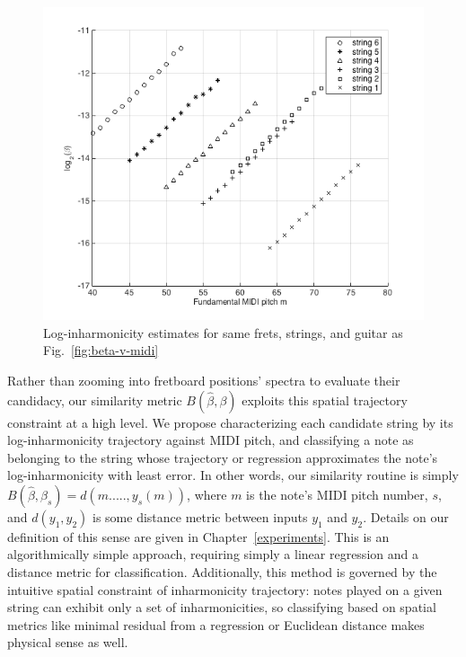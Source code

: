 \documentclass[12pt]{cmuthesis}
\begin{document}
\begin{figure}[h] 
\label{fig:log-beta-v-midi}
\centering
\includegraphics[scale=0.7]{log-beta-v-midi}
\caption{Log-inharmonicity estimates for same frets, strings, and guitar as Fig.~\ref{fig:beta-v-midi}}
\end{figure}

Rather than zooming into fretboard positions' spectra to evaluate their candidacy, our similarity metric $B(\hat{\beta},\beta)$ exploits this spatial trajectory constraint at a high level. We propose characterizing each candidate string by its log-inharmonicity trajectory against MIDI pitch, and classifying a note as belonging to the string whose trajectory or regression approximates the note's log-inharmonicity with least error. In other words, our similarity routine is simply $B(\hat{\beta},\beta_s) = d(m....., y_s(m))$, where $m$ is the note's MIDI pitch number, $s$, and $d(y_1,y_2)$ is some distance metric between inputs $y_1$ and $y_2$. Details on our definition of this sense are given in Chapter~\ref{experiments}. This is an algorithmically simple approach, requiring simply a linear regression and a distance metric for classification. Additionally, this method is governed by the intuitive spatial constraint of inharmonicity trajectory: notes played on a given string can exhibit only a set of inharmonicities, so classifying based on spatial metrics like minimal residual from a regression or Euclidean distance makes physical sense as well. 

\end{document}
